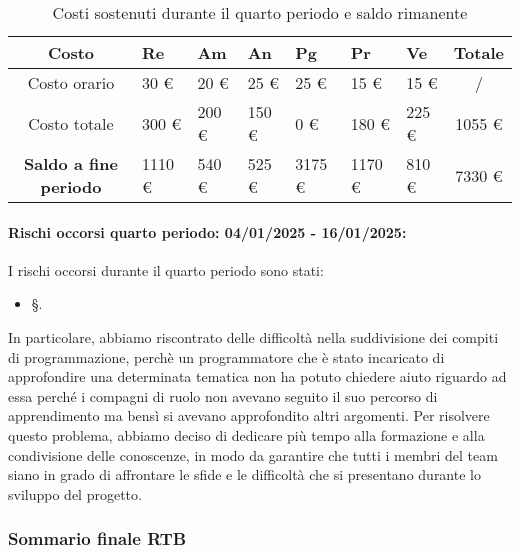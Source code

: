 \begin{table}[!h]
    \centering
    \renewcommand{\arraystretch}{1.5}
    \begin{tabularx}{\textwidth}{|c|X|X|X|X|X|X|c|}\hline
    \rowcolor[HTML]{FFD700} 
    \textbf{Costo} & \textbf{Re} & \textbf{Am} & \textbf{An} & \textbf{Pg} & \textbf{Pr} & \textbf{Ve} & \textbf{Totale} \\ \hline
    Costo orario & 30 \euro & 20 \euro & 25 \euro & 25 \euro & 15 \euro & 15 \euro & /  \\ \hline
    Costo totale & 300 \euro & 200 \euro & 150 \euro & 0 \euro & 180 \euro & 225 \euro & 1055 \euro \\ \hline
    \rowcolor[HTML]{FFD700} 
    \textbf{Saldo a fine periodo}  & 1110 \euro & 540 \euro  & 525 \euro & 3175 \euro & 1170 \euro & 810 \euro & 7330 \euro \\ \hline
    \end{tabularx}
    \caption{Costi sostenuti durante il quarto periodo e saldo rimanente}
\end{table}

\paragraph{Rischi occorsi quarto periodo: 04/01/2025 - 16/01/2025: }
I rischi occorsi durante il quarto periodo sono stati:
\begin{itemize}
    \item \S{}.
\end{itemize}
In particolare, abbiamo riscontrato delle difficoltà nella suddivisione dei compiti di programmazione, perchè un programmatore che è stato incaricato di approfondire una determinata tematica non ha potuto chiedere aiuto riguardo ad essa perché i compagni di ruolo non avevano seguito il suo percorso di apprendimento ma bensì si avevano approfondito altri argomenti.
Per risolvere questo problema, abbiamo deciso di dedicare più tempo alla formazione e alla condivisione delle conoscenze, in modo da garantire che tutti i membri del team siano in grado di affrontare le sfide e le difficoltà che si presentano durante lo sviluppo del progetto.

\newpage
\subsubsection{Sommario finale RTB}   
\label{sec:prev_cons_rtb} 

